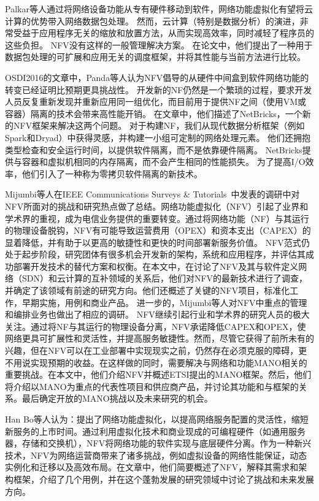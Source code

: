 Palkar等人通过将网络设备功能从专有硬件移动到软件，网络功能虚拟化有望将云计算的优势带入网络数据包处理。 然而，云计算（特别是数据分析）的演进，非常受益于应用程序无关的缩放和放置方法，从而实现高效率，同时减轻了程序员的这些负担。 NFV没有这样的一般管理解决方案。 在论文中，他们提出了一种用于数据包处理的可扩展和应用无关的调度框架，并将其性能与当前方法进行比较。

OSDI2016的文章中，Panda等人认为NFV倡导的从硬件中间盒到软件网络功能的转变已经证明比预期更具挑战性。 开发新的NF仍然是一个繁琐的过程，要求开发人员反复重新发现并重新应用同一组优化，而目前用于提供NF之间（使用VM或容器）隔离的技术会带来高性能开销。 在文章中，他们描述了NetBricks，一个新的NFV框架来解决这两个问题。 对于构建NF，我们从现代数据分析框架（例如Spark和Dryad）中获得灵感，并构建一小组可定制的网络处理元素。 他们还拥抱类型检查和安全运行时间，以提供软件隔离，而不是依靠硬件隔离。 NetBricks提供与容器和虚拟机相同的内存隔离，而不会产生相同的性能损失。 为了提高I/O效率，他们引入了一种称为零拷贝软件隔离的新技术。

Mijumbi等人在IEEE Communications Surveys \& Tutorials 中发表的调研中对NFV所面对的挑战和研究热点做了总结。网络功能虚拟化（NFV）引起了业界和学术界的重视，成为电信业务提供的重要转变。通过将网络功能（NF）与其运行的物理设备脱钩，NFV有可能导致运营费用（OPEX）和资本支出（CAPEX）的显着降低，并有助于以更高的敏捷性和更快的时间部署新服务价值。 NFV范式仍处于起步阶段，研究团体有很多机会开发新的架构，系统和应用程序，并评估其成功部署开发技术的替代方案和权衡。在本文中，在讨论了NFV及其与软件定义网络（SDN）和云计算的互补领域的关系后，他们对NFV的最新技术进行了调查，并确定了该领域有前途的研究方向。他们还概述了关键的NFV项目，标准化工作，早期实施，用例和商业产品。
进一步的，Mijumbi等人对NFV中重点的管理和编排业务也做出了相应的调研。
NFV继续引起行业和学术界的研究人员的极大关注。通过将NF与其运行的物理设备分离，NFV承诺降低CAPEX和OPEX，使网络更具可扩展性和灵活性，并提高服务敏捷性。然而，尽管它获得了前所未有的兴趣，但在NFV可以在工业部署中实现现实之前，仍然存在必须克服的障碍，更不用说实现预期的收益。在这样做的同时，需要解决与网络和功能MANO相关的重要挑战。在本文中，他们介绍NFV并概述ETSI提出的MANO框架。然后，他们将介绍以MANO为重点的代表性项目和供应商产品，并讨论其功能和与框架的关系。最后确定开放的MANO挑战以及未来研究的机会。

Han Bo等人认为：提出了网络功能虚拟化，以提高网络服务配置的灵活性，缩短新服务的上市时间。通过利用虚拟化技术和商业现成的可编程硬件（如通用服务器，存储和交换机），NFV将网络功能的软件实现与底层硬件分离。作为一种新兴技术，NFV为网络运营商带来了诸多挑战，例如虚拟设备的网络性能保证，动态实例化和迁移以及高效布局。在文章中，他们简要概述了NFV，解释其需求和架构框架，介绍了几个用例，并在这个蓬勃发展的研究领域中讨论了挑战和未来发展方向。

